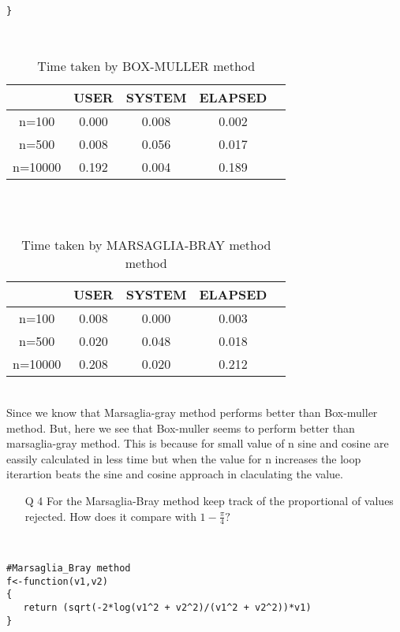 \documentclass[11pt]{article}
\begin{document}
{{{{\begin{lstlisting}
}

\end{lstlisting}

\\
\begin{table}[h!]
\centering
\begin{tabular}{||c|c|c| c|c||}
\hline
&USER &SYSTEM&ELAPSED \\
[0.5ex]
\hline\hline
n=100&0.000&0.008&0.002\\	
n=500&0.008&0.056&0.017\\
n=10000&0.192&0.004&0.189\\
[1ex]
\hline
\end{tabular}
\caption{Time taken by BOX-MULLER method}
\label{table:1}
\end{table}\\

\\
\begin{table}[h!]
\centering
\begin{tabular}{||c|c|c| c|c||}
\hline
&USER &SYSTEM&ELAPSED \\
[0.5ex]
\hline\hline
n=100&0.008&0.000&0.003\\	
n=500&0.020&0.048&0.018\\
n=10000&0.208&0.020&0.212\\
[1ex]
\hline
\end{tabular}
\caption{Time taken by MARSAGLIA-BRAY method method}
\label{table:1}
\end{table}\\

Since we know that Marsaglia-gray method performs better than Box-muller method. But, here we see that Box-muller seems to perform better than marsaglia-gray method. This is because for small value of n sine and cosine are eassily calculated in less time but when the value for n increases the loop iterartion beats the sine and cosine approach in claculating the value.

\begin{enumerate}

\item[Q 4] For the Marsaglia-Bray method keep track of the proportional of values rejected. How does it compare with $1 - \frac{\pi}{4} ?$
\end{enumerate}
\\
\begin{lstlisting}
#Marsaglia_Bray method
f<-function(v1,v2)
{
   return (sqrt(-2*log(v1^2 + v2^2)/(v1^2 + v2^2))*v1)
}


\end{lstlisting}}}}}
\end{document}
